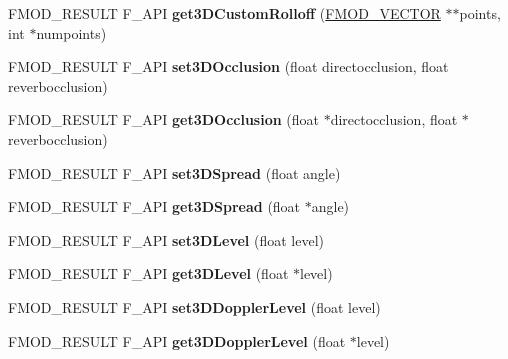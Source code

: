 \begin{DoxyCompactItemize}
F\+M\+O\+D\+\_\+\+R\+E\+S\+U\+LT F\+\_\+\+A\+PI {\bfseries get3\+D\+Custom\+Rolloff} (\hyperlink{structFMOD__VECTOR}{F\+M\+O\+D\+\_\+\+V\+E\+C\+T\+OR} $\ast$$\ast$points, int $\ast$numpoints)
\item 
\mbox{\label{classFMOD_1_1ChannelControl_aec9d420c82b59c552ab46f53b99a92a4}} 
F\+M\+O\+D\+\_\+\+R\+E\+S\+U\+LT F\+\_\+\+A\+PI {\bfseries set3\+D\+Occlusion} (float directocclusion, float reverbocclusion)
\item 
\mbox{\label{classFMOD_1_1ChannelControl_ad4bfb501ccd002ccbb0d0925d4258ef8}} 
F\+M\+O\+D\+\_\+\+R\+E\+S\+U\+LT F\+\_\+\+A\+PI {\bfseries get3\+D\+Occlusion} (float $\ast$directocclusion, float $\ast$reverbocclusion)
\item 
\mbox{\label{classFMOD_1_1ChannelControl_a12bba143567655a19886bdda772c60c6}} 
F\+M\+O\+D\+\_\+\+R\+E\+S\+U\+LT F\+\_\+\+A\+PI {\bfseries set3\+D\+Spread} (float angle)
\item 
\mbox{\label{classFMOD_1_1ChannelControl_a3b771f6762f3d472eda8d5e9e323f9c3}} 
F\+M\+O\+D\+\_\+\+R\+E\+S\+U\+LT F\+\_\+\+A\+PI {\bfseries get3\+D\+Spread} (float $\ast$angle)
\item 
\mbox{\label{classFMOD_1_1ChannelControl_a4ea9d36f487d6b0b41f1f9d64977c153}} 
F\+M\+O\+D\+\_\+\+R\+E\+S\+U\+LT F\+\_\+\+A\+PI {\bfseries set3\+D\+Level} (float level)
\item 
\mbox{\label{classFMOD_1_1ChannelControl_abeb7d638eb2599c22697eb1083a7cee7}} 
F\+M\+O\+D\+\_\+\+R\+E\+S\+U\+LT F\+\_\+\+A\+PI {\bfseries get3\+D\+Level} (float $\ast$level)
\item 
\mbox{\label{classFMOD_1_1ChannelControl_ac018af41cf8889e6ad76c7b9503e5300}} 
F\+M\+O\+D\+\_\+\+R\+E\+S\+U\+LT F\+\_\+\+A\+PI {\bfseries set3\+D\+Doppler\+Level} (float level)
\item 
\mbox{\label{classFMOD_1_1ChannelControl_a0b57ab9a75c712f06cde4cd83bb52401}} 
F\+M\+O\+D\+\_\+\+R\+E\+S\+U\+LT F\+\_\+\+A\+PI {\bfseries get3\+D\+Doppler\+Level} (float $\ast$level)
$$
\end{DoxyCompactItemize}
